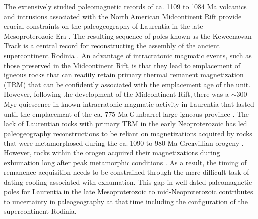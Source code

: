 \documentclass[draft]{agujournal2019}
\begin{document}
The extensively studied paleomagnetic records of ca. 1109 to 1084 Ma volcanics and intrusions associated with the North American Midcontinent Rift provide crucial constraints on the paleogeography of Laurentia in the late Mesoproterozoic Era \cite{Halls1982a, Fairchild2017a, Swanson-Hysell2019a}. The resulting sequence of poles known as the Keweenawan Track is a central record for reconstructing the assembly of the ancient supercontinent Rodinia \cite{Evans2021b}. An advantage of intracratonic magmatic events, such as those preserved in the Midcontinent Rift, is that they lead to emplacement of igneous rocks that can readily retain primary thermal remanent magnetization (TRM) that can be confidently associated with the emplacement age of the unit. However, following the development of the Midcontinent Rift, there was a $\sim$300 Myr quiescence in known intracratonic magmatic activity in Laurentia that lasted until the emplacement of the ca. 775 Ma Gunbarrel large igneous province \cite{Harlan2003a, Mackinder2019a, Swanson-Hysell2021c}. The lack of Laurentian rocks with primary TRM in the early Neoproterozoic has led paleogeography reconstructions to be reliant on magnetizations acquired by rocks that were metamorphosed during the ca. 1090 to 980 Ma Grenvillian orogeny \cite{Rivers2012a, Swanson-Hysell2023a}. However, rocks within the orogen acquired their magnetizations during exhumation long after peak metamorphic conditions \cite{McWilliams1975a}. As a result, the timing of remanence acquisition needs to be constrained through the more difficult task of dating cooling associated with exhumation. This gap in well-dated paleomagnetic poles for Laurentia in the late Mesoproterozoic to mid-Neoproterozoic contributes to uncertainty in paleogeography at that time including the configuration of the supercontinent Rodinia.
\end{document}
